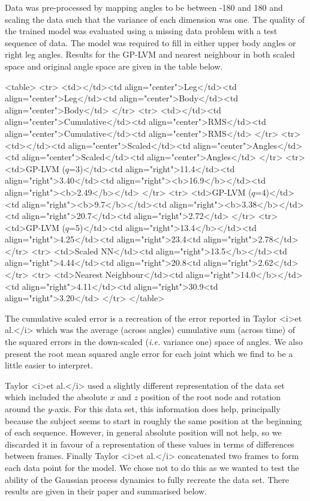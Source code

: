 Data was pre-processed by mapping angles to be between -180 and 180 and scaling the data such that the variance of each dimension was one.
The quality of the trained model was evaluated using a missing data problem with a test sequence of data. The model was required to fill in either upper body angles or right leg angles. Results for the GP-LVM and nearest neighbour in both scaled space and original angle space are given in the table below.
\begin{center}
<table>
<tr>
<td></td><td align="center">Leg</td><td align="center">Leg</td><td align="center">Body</td><td align="center">Body</td>
</tr>
<tr>
<td></td><td align="center">Cumulative</td><td align="center">RMS</td><td align="center">Cumulative</td><td align="center">RMS</td>
</tr>
<tr>
<td></td><td align="center">Scaled</td><td align="center">Angles</td><td align="center">Scaled</td><td align="center">Angles</td>
</tr>
<tr>
<td>GP-LVM ($q$=3)</td><td align="right">11.4</td><td align="right">3.40</td><td align="right"><b>16.9</b></td><td align="right"><b>2.49</b></td>
</tr>
<tr>
<td>GP-LVM ($q$=4)</td><td align="right"><b>9.7</b></td><td align="right"><b>3.38</b></td><td align="right">20.7</td><td align="right">2.72</td>
</tr>
<tr>
<td>GP-LVM ($q$=5)</td><td align="right">13.4</b></td><td align="right">4.25</td><td align="right">23.4<td align="right">2.78</td>
</tr>
<tr>
<td>Scaled NN</td><td align="right">13.5</b></td><td align="right">4.44</td><td align="right">20.8<td align="right">2.62</td>
</tr>
<tr>
<td>Nearest Neighbour</td><td align="right">14.0</b></td><td align="right">4.11</td><td align="right">30.9<td align="right">3.20</td>
</tr>
</table>
\end{center}
The cumulative scaled error is a recreation of the error reported in Taylor <i>et al.</i> which was the average (across angles) cumulative sum (across time) of the squared errors in the down-scaled (\emph{i.e.} variance one) space of angles. We also present the root mean squared angle error for each joint which we find to be a little easier to interpret.

Taylor <i>et al.</i> used a slightly different representation of
the data set which included the absolute $x$ and $z$
position of the root node and rotation around the $y$-axis. For
this data set, this information does help, principally because the
subject seems to start in roughly the same position at the beginning
of each sequence. However, in general absolute position will not help,
so we discarded it in favour of a representation of these values in
terms of differences between frames. Finally Taylor <i>et al.</i>
concatenated two frames to form each data point for the model. We
chose not to do this as we wanted to test the ability of the Gaussian
process dynamics to fully recreate the data set. There results are given in their paper and summarised below.

